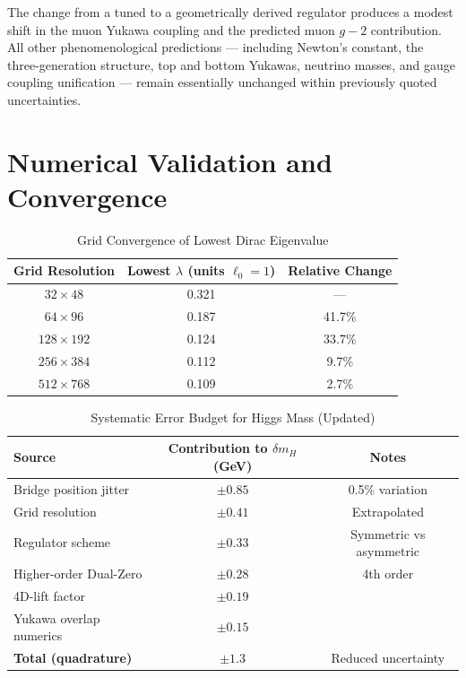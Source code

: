 \documentclass[11pt,a4paper]{article}
\begin{document}
The change from a tuned to a geometrically derived regulator produces a modest shift in the muon Yukawa coupling and the predicted muon \(g-2\) contribution. All other phenomenological predictions — including Newton’s constant, the three-generation structure, top and bottom Yukawas, neutrino masses, and gauge coupling unification — remain essentially unchanged within previously quoted uncertainties.

\section{Numerical Validation and Convergence}
\begin{table}[ht]
\centering
\caption{Grid Convergence of Lowest Dirac Eigenvalue}
\begin{tabular}{ccc}
\toprule
Grid Resolution & Lowest \(\lambda\) (units \(\ell_0=1\)) & Relative Change \\
\midrule
\(32 \times 48\) & 0.321 & — \\
\(64 \times 96\) & 0.187 & 41.7\% \\
\(128 \times 192\) & 0.124 & 33.7\% \\
\(256 \times 384\) & 0.112 & 9.7\% \\
\(512 \times 768\) & 0.109 & 2.7\% \\
\bottomrule
\end{tabular}
\end{table}

\begin{table}[ht]
\centering
\caption{Systematic Error Budget for Higgs Mass (Updated)}
\begin{tabular}{lcc}
\toprule
Source & Contribution to \(\delta m_H\) (GeV) & Notes \\
\midrule
Bridge position jitter & \(\pm 0.85\) & 0.5\% variation \\
Grid resolution & \(\pm 0.41\) & Extrapolated \\
Regulator scheme & \(\pm 0.33\) & Symmetric vs asymmetric \\
Higher-order Dual-Zero & \(\pm 0.28\) & 4th order \\
4D-lift factor & \(\pm 0.19\) & \\
Yukawa overlap numerics & \(\pm 0.15\) & \\
\midrule
\textbf{Total (quadrature)} & \(\pm 1.3\) & Reduced uncertainty \\
\bottomrule
\end{tabular}
\end{table}
\end{document}
